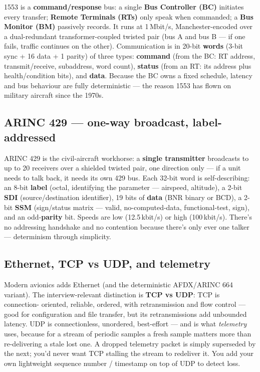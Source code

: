 1553 is a \textbf{command/response} bus: a single \textbf{Bus Controller (BC)}
initiates every transfer; \textbf{Remote Terminals (RTs)} only speak when
commanded; a \textbf{Bus Monitor (BM)} passively records. It runs at 1\,Mbit/s,
Manchester-encoded over a dual-redundant transformer-coupled twisted pair (bus A
and bus B --- if one fails, traffic continues on the other). Communication is in
20-bit \textbf{words} (3-bit sync + 16 data + 1 parity) of three types:
\textbf{command} (from the BC: RT address, transmit/receive, subaddress, word
count), \textbf{status} (from an RT: its address plus health/condition bits),
and \textbf{data}. Because the BC owns a fixed schedule, latency and bus
behaviour are fully deterministic --- the reason 1553 has flown on military
aircraft since the 1970s.

\subsection{ARINC 429 --- one-way broadcast, label-addressed}

ARINC 429 is the civil-aircraft workhorse: a \textbf{single transmitter}
broadcasts to up to 20 receivers over a shielded twisted pair, one direction
only --- if a unit needs to talk back, it needs its own 429 bus. Each 32-bit
word is self-describing: an 8-bit \textbf{label} (octal, identifying the
parameter --- airspeed, altitude), a 2-bit \textbf{SDI} (source/destination
identifier), 19 bits of \textbf{data} (BNR binary or BCD), a 2-bit \textbf{SSM}
(sign/status matrix --- valid, no-computed-data, functional-test, sign), and an
odd-\textbf{parity} bit. Speeds are low (12.5\,kbit/s) or high (100\,kbit/s).
There's no addressing handshake and no contention because there's only ever one
talker --- determinism through simplicity.

\subsection{Ethernet, TCP vs UDP, and telemetry}

Modern avionics adds Ethernet (and the deterministic AFDX/ARINC 664 variant).
The interview-relevant distinction is \textbf{TCP vs UDP}: TCP is connection-
oriented, reliable, ordered, with retransmission and flow control --- good for
configuration and file transfer, but its retransmissions add unbounded latency.
UDP is connectionless, unordered, best-effort --- and is what \emph{telemetry}
uses, because for a stream of periodic samples a fresh sample matters more than
re-delivering a stale lost one. A dropped telemetry packet is simply superseded
by the next; you'd never want TCP stalling the stream to redeliver it. You add
your own lightweight sequence number / timestamp on top of UDP to detect loss.

